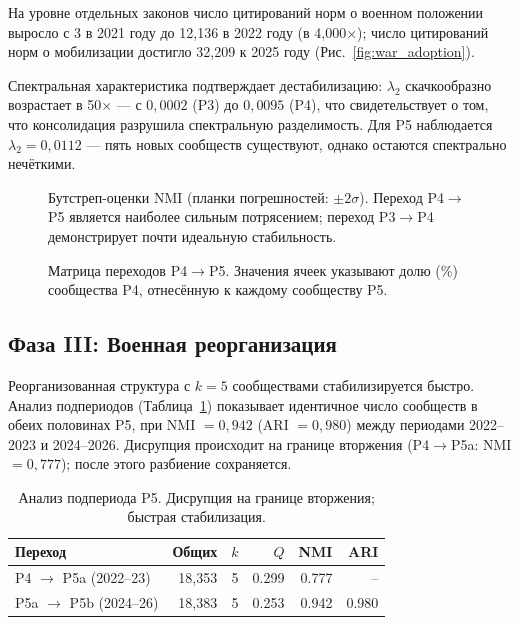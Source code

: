 \documentclass[11pt]{article}
\begin{document}
На уровне отдельных законов число цитирований норм о военном положении выросло с 3 в 2021 году до 12{,}136 в 2022 году (в 4{,}000$\times$); число цитирований норм о мобилизации достигло 32{,}209 к 2025 году (Рис.~\ref{fig:war_adoption}).

Спектральная характеристика подтверждает дестабилизацию: $\lambda_2$ скачкообразно возрастает в 50$\times$ --- с $0{,}0002$ (P3) до $0{,}0095$ (P4), что свидетельствует о том, что консолидация разрушила спектральную разделимость.
Для P5 наблюдается $\lambda_2 = 0{,}0112$ --- пять новых сообществ существуют, однако остаются спектрально нечёткими.

\begin{figure}[t]
\centering

\caption{Бутстреп-оценки NMI (планки погрешностей: $\pm 2\sigma$). Переход P4$\to$P5 является наиболее сильным потрясением; переход P3$\to$P4 демонстрирует почти идеальную стабильность.}
\label{fig:nmi_bars}
\end{figure}

\begin{figure}[t]
\centering

\caption{Матрица переходов P4$\to$P5. Значения ячеек указывают долю (\%) сообщества P4, отнесённую к каждому сообществу P5.}
\label{fig:transition}
\end{figure}



\subsection{Фаза III: Военная реорганизация}

Реорганизованная структура с $k = 5$ сообществами стабилизируется быстро.
Анализ подпериодов (Таблица~\ref{tab:subperiod}) показывает идентичное число сообществ в обеих половинах P5, при NMI $= 0{,}942$ (ARI $= 0{,}980$) между периодами 2022--2023 и 2024--2026.
Дисрупция происходит на границе вторжения (P4$\to$P5a: NMI $= 0{,}777$); после этого разбиение сохраняется.

\begin{table}[t]
\centering
\small
\caption{Анализ подпериода P5. Дисрупция на границе вторжения; быстрая стабилизация.}
\label{tab:subperiod}
\begin{tabular}{@{}lrrrrr@{}}
\toprule
\textbf{Переход} & \textbf{Общих} & $k$ & $Q$ & \textbf{NMI} & \textbf{ARI} \\
\midrule
P4 $\to$ P5a (2022--23) & 18,353 & 5 & 0.299 & 0.777 & -- \\
P5a $\to$ P5b (2024--26) & 18,383 & 5 & 0.253 & 0.942 & 0.980 \\
\bottomrule
\end{tabular}
\end{table}
\end{document}
